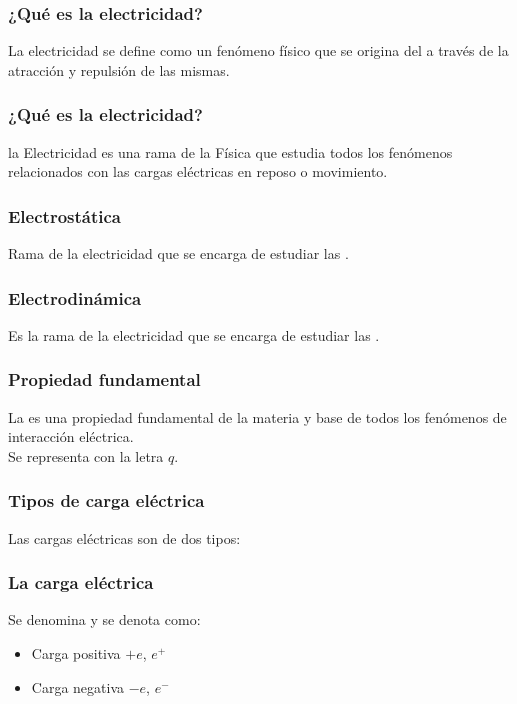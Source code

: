 \documentclass[14pt]{beamer}
\begin{document}
\begin{frame}
\frametitle{¿Qué es la electricidad?}
La electricidad se define como un fenómeno físico que se origina del  a través de la atracción y repulsión de las mismas.
\end{frame}
\begin{frame}
\frametitle{¿Qué es la electricidad?}
la Electricidad es una rama de la Física que estudia todos los fenómenos relacionados con las cargas eléctricas en reposo o movimiento.
\end{frame}
\begin{frame}
\frametitle{Electrostática}
Rama de la electricidad que se encarga de estudiar las .
\end{frame}
\begin{frame}
\frametitle{Electrodinámica}
Es la rama de la electricidad que se encarga de estudiar las .
\end{frame}
\begin{frame}
\frametitle{Propiedad fundamental}
La  es una propiedad fundamental de la materia y base de todos los fenómenos de interacción eléctrica.
\\
\bigskip
\pause
Se representa con la letra $q$.
\end{frame}
\begin{frame}
\frametitle{Tipos de carga eléctrica}
Las cargas eléctricas son de dos tipos:
\pause
\begin{figure}
    \centering
\end{figure}
\end{frame}
\begin{frame}
\frametitle{La carga eléctrica}
Se denomina  y se denota como:
\pause
\begin{itemize}
\item Carga positiva $+e$, $e^{+}$
\item Carga negativa $-e$, $e^{-}$
\end{itemize}
\end{frame}
\end{document}

